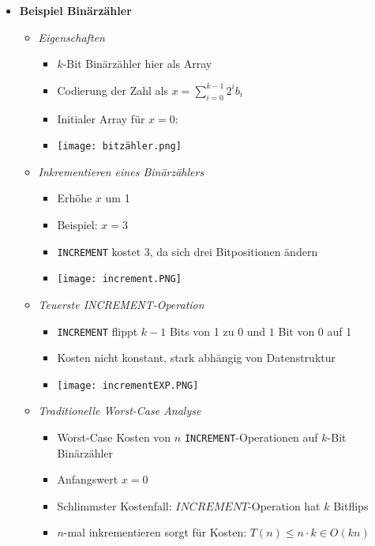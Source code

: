 \begin{itemize}
        \item \textbf{Beispiel Binärzähler}
            \begin{itemize}
                \item \textit{Eigenschaften}
                    \begin{itemize}
                        \item $k$-Bit Binärzähler hier als Array
                        \item Codierung der Zahl als $x=\sum^{k-1}_{i=0}2^i b_i$
                        \item Initialer Array für $x = 0$:
                        \item[] \texttt{[image: bitzähler.png]}
                    \end{itemize}
                \item \textit{Inkrementieren eines Binärzählers}
                    \begin{itemize}
                        \item Erhöhe $x$ um 1 
                        \item Beispiel: $x=3$
                        \item \texttt{INCREMENT} kostet 3, da sich drei Bitpositionen ändern
                        \item \texttt{[image: increment.PNG]}
                    \end{itemize}
                \item \textit{Teuerste INCREMENT-Operation}
                    \begin{itemize}
                        \item \texttt{INCREMENT} flippt $k-1$ Bits von 1 zu 0 und $1$ Bit von 0 auf 1
                        \item Kosten nicht konstant, stark abhängig von Datenstruktur
                        \item \texttt{[image: incrementEXP.PNG]}
                    \end{itemize}
                \item \textit{Traditionelle Worst-Case Analyse}
                    \begin{itemize}
                        \item Worst-Case Kosten von $n$ \texttt{INCREMENT}-Operationen auf $k$-Bit Binärzähler
                        \item Anfangswert $x = 0$
                        \item Schlimmster Kostenfall: $INCREMENT$-Operation hat $k$ Bitflips
                        \item $n$-mal inkrementieren sorgt für Kosten: $T(n) \leq n \cdot k \in O(kn)$
                    \end{itemize}
            \end{itemize}


\end{itemize}
